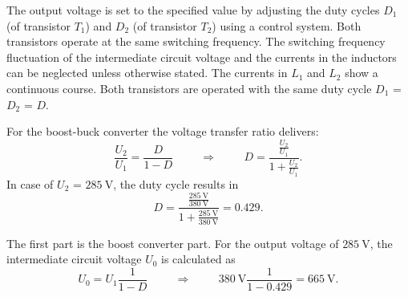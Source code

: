 The output voltage is set to the specified value by adjusting the duty cycles $D_\mathrm{1}$ (of transistor $T_\mathrm{1}$) 
and $D_\mathrm{2}$ (of transistor $T_\mathrm{2}$) using a control system. Both transistors operate at the same switching frequency. 
The switching frequency fluctuation of the intermediate circuit voltage and the currents in the inductors can be neglected unless otherwise stated. 
The currents in $L_\mathrm{1}$ and $L_\mathrm{2}$ show a continuous course. Both transistors are operated with the 
same duty cycle $D_\mathrm{1}$ = $D_\mathrm{2}$ = $D$.


\begin{solutionblock}
    For the boost-buck converter the voltage transfer ratio delivers:
    \begin{equation}
        \frac{U_\mathrm{2}}{U_\mathrm{1}} = \frac{D} {1-D}
        \hspace{1cm} \Rightarrow \hspace{1cm}
        D = \frac{\frac{U_\mathrm{2}}{U_\mathrm{1}}} {1+{\frac{U_\mathrm{2}}{U_\mathrm{1}}}}.
        \label{eq:DutyCycleEx03}
    \end{equation}
    In case of $U_\mathrm{2}$ = $\SI{285}{\volt}$, the duty cycle results in
    \begin{equation}
       D=\frac{\frac{\SI{285}{\volt}}{\SI{380}{\volt}}} {1+{\frac{\SI{285}{\volt}}{\SI{380}{\volt}}}} = 0.429.
    \end{equation}
\end{solutionblock}



\begin{solutionblock}
    The first part is the boost converter part. For the output voltage 
    of $\SI{285}{\volt}$, the intermediate circuit voltage $U_\mathrm{0}$ is calculated as
    \begin{equation}
        U_\mathrm{0}=U_\mathrm{1} \frac{1}{1-D} 
        \hspace{1cm} \Rightarrow \hspace{1cm}  
        \SI{380}{\volt} \frac{1}{1-0.429} = \SI{665}{\volt}.
        \label{eq:DCLinkEx03}        
    \end{equation}
\end{solutionblock}


